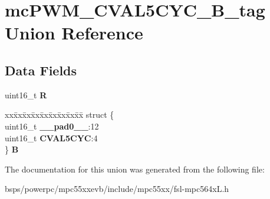 \hypertarget{unionmcPWM__CVAL5CYC__16B__tag}{}\section{mc\+P\+W\+M\+\_\+\+C\+V\+A\+L5\+C\+Y\+C\+\_\+B\+\_\+tag Union Reference}
\label{unionmcPWM__CVAL5CYC__16B__tag}
\subsection*{Data Fields}
\begin{DoxyCompactItemize}
\item 
\mbox{\label{unionmcPWM__CVAL5CYC__16B__tag_a2b66b9194b8713bc9cfef281192ddc5e}} 
uint16\+\_\+t {\bfseries R}
\item 
\mbox{\label{unionmcPWM__CVAL5CYC__16B__tag_af9fac48d341e61ec380de475e5d8c0b7}} 
\begin{tabbing}
xx\=xx\=xx\=xx\=xx\=xx\=xx\=xx\=xx\=\kill
struct \{\\
\>uint16\_t {\bfseries \_\_pad0\_\_}:12\\
\>uint16\_t {\bfseries CVAL5CYC}:4\\
\} {\bfseries B}\\

\end{tabbing}\end{DoxyCompactItemize}


The documentation for this union was generated from the following file\+:\begin{DoxyCompactItemize}
\item 
bsps/powerpc/mpc55xxevb/include/mpc55xx/fsl-\/mpc564x\+L.\+h\end{DoxyCompactItemize}
